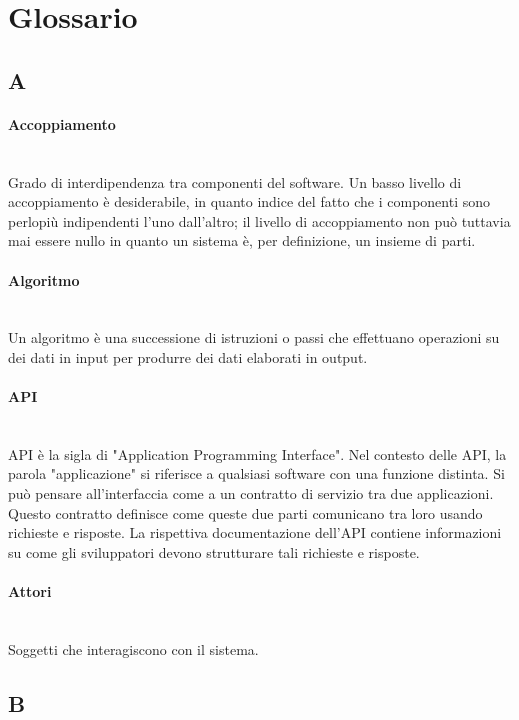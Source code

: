 \section{Glossario}
\subsection*{A}

\paragraph{Accoppiamento}~\smallskip \\
Grado di interdipendenza tra componenti del software. Un basso livello di accoppiamento è desiderabile, in quanto indice del fatto che i componenti sono perlopiù indipendenti l'uno dall'altro; il livello di accoppiamento non può tuttavia mai essere nullo in quanto un sistema è, per definizione, un insieme di parti.

\paragraph{Algoritmo}~\smallskip \\
Un algoritmo è una successione di istruzioni o passi che effettuano operazioni su dei dati in input per produrre dei dati elaborati in output.

\paragraph{API}~\smallskip \\
API è la sigla di "Application Programming Interface". Nel contesto delle API, la parola "applicazione" si riferisce a qualsiasi software con una funzione distinta. Si può pensare all'interfaccia come a un contratto di servizio tra due applicazioni. Questo contratto definisce come queste due parti comunicano tra loro usando richieste e risposte. La rispettiva documentazione dell'API contiene informazioni su come gli sviluppatori devono strutturare tali richieste e risposte.

\paragraph{Attori}~\smallskip \\
Soggetti che interagiscono con il sistema.
\newpage
{}
\subsection*{B}
